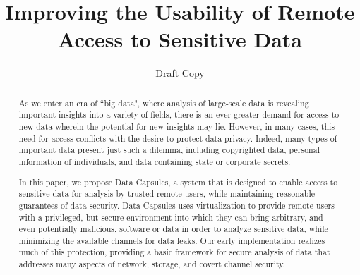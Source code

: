 \documentclass{acm_proc_article-sp}
\begin{document}
\title{Improving the Usability of Remote Access to Sensitive Data}

\author{
Draft Copy
}

%

\maketitle
\begin{abstract}

As we enter an era of ``big data", where analysis of large-scale data is
revealing important insights into a variety of fields, there is an ever greater
demand for access to new data wherein the potential for new insights may lie.
However, in many cases, this need for access conflicts with the desire to
protect data privacy.  Indeed, many types of important data present just such a
dilemma, including copyrighted data, personal information of individuals, and
data containing state or corporate secrets.

In this paper, we propose Data Capsules, a system that is designed to enable
access to sensitive data for analysis by trusted remote users, while
maintaining reasonable guarantees of data security.  Data Capsules uses
virtualization to provide remote users with a privileged, but secure
environment into which they can bring arbitrary, and even potentially
malicious, software or data in order to analyze sensitive data, while
minimizing the available channels for data leaks.  Our early implementation
realizes much of this protection, providing a basic framework for secure analysis of data that addresses many aspects of network, storage, and covert channel security.

\end{abstract}
\end{document}
